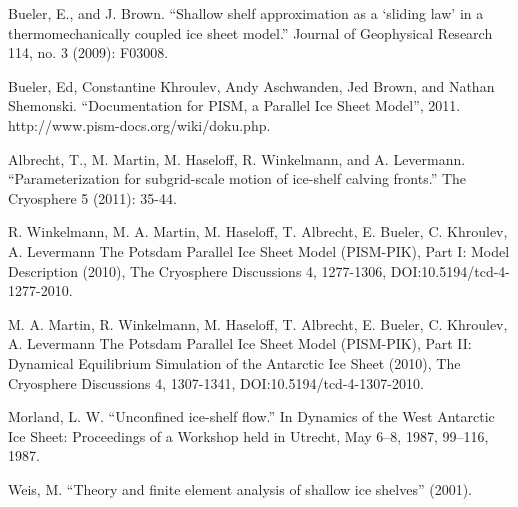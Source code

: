 \documentclass[a4paper,10pt]{article}
\begin{document}
\begin{thebibliography}{9}

 Bueler, E., and J. Brown. “Shallow shelf approximation as a ‘sliding law’ in a thermomechanically coupled ice sheet model.” Journal of Geophysical Research 114, no. 3 (2009): F03008.

Bueler, Ed, Constantine Khroulev, Andy Aschwanden, Jed Brown, and Nathan Shemonski. “Documentation for PISM, a Parallel Ice Sheet Model”, 2011. http://www.pism-docs.org/wiki/doku.php.

 Albrecht, T., M. Martin, M. Haseloff, R. Winkelmann, and A. Levermann. “Parameterization for subgrid-scale motion of ice-shelf calving fronts.” The Cryosphere 5 (2011): 35-44.

 R. Winkelmann, M. A. Martin, M. Haseloff, T. Albrecht, E. Bueler, C. Khroulev, A. Levermann
The Potsdam Parallel Ice Sheet Model (PISM-PIK), Part I: Model Description
(2010), The Cryosphere Discussions 4, 1277-1306, DOI:10.5194/tcd-4-1277-2010.

 M. A. Martin, R. Winkelmann, M. Haseloff, T. Albrecht, E. Bueler, C. Khroulev, A. Levermann
The Potsdam Parallel Ice Sheet Model (PISM-PIK), Part II: Dynamical Equilibrium Simulation of the Antarctic Ice Sheet
(2010), The Cryosphere Discussions 4, 1307-1341, DOI:10.5194/tcd-4-1307-2010.

 Morland, L. W. “Unconfined ice-shelf flow.” In Dynamics of the West Antarctic Ice Sheet: Proceedings of a Workshop held in Utrecht, May 6–8, 1987, 99–116, 1987.


 Weis, M. “Theory and finite element analysis of shallow ice shelves” (2001).


\end{thebibliography}
\end{document}
